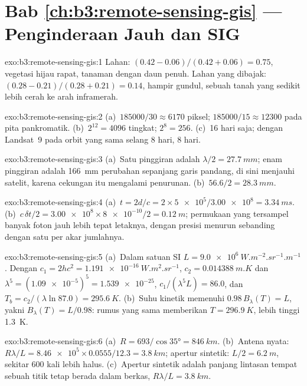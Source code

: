 \section*{Bab \ref{ch:b3:remote-sensing-gis} --- Penginderaan Jauh dan SIG}

\begin{solution}{exo:b3:remote-sensing-gis:1}
Lahan: $(0.42 - 0.06)/(0.42 + 0.06) = 0.75$, vegetasi hijau rapat, tanaman
dengan daun penuh. Lahan yang dibajak: $(0.28 - 0.21)/(0.28 + 0.21) = 0.14$, hampir
gundul, sebuah tanah yang sedikit lebih cerah ke arah inframerah.
\end{solution}

\begin{solution}{exo:b3:remote-sensing-gis:2}
(a)~$185000/30 \approx 6170$ piksel; $185000/15 \approx 12300$ pada
pita pankromatik. (b)~$2^{12} = 4096$ tingkat; $2^8 = 256$. (c)~16 hari
saja; dengan Landsat~9 pada orbit yang sama selang 8 hari, 8 hari.
\end{solution}

\begin{solution}{exo:b3:remote-sensing-gis:3}
(a)~Satu pinggiran adalah $\lambda/2 = \qty{27.7}{mm}$; enam pinggiran
adalah \qty{166}{mm} perubahan sepanjang garis pandang, di sini menjauhi satelit, karena
cekungan itu mengalami penurunan. (b)~$56.6/2 = \qty{28.3}{mm}$.
\end{solution}

\begin{solution}{exo:b3:remote-sensing-gis:4}
(a)~$t = 2d/c = 2\times\num{5e5}/\num{3.00e8} = \qty{3.34}{ms}$.
(b)~$c\,\delta t/2 = \num{3.00e8}\times\num{8e-10}/2 = \qty{0.12}{m}$; permukaan
yang tersampel banyak foton jauh lebih tepat letaknya, dengan presisi
menurun sebanding dengan satu per akar jumlahnya.
\end{solution}

\begin{solution}{exo:b3:remote-sensing-gis:5}
(a)~Dalam satuan SI $L = \qty{9.0e6}{W.m^{-2}.sr^{-1}.m^{-1}}$. Dengan $c_1 =
2hc^2 = \qty{1.191e-16}{W.m^2.sr^{-1}}$, $c_2 = \qty{0.014388}{m.K}$ dan
$\lambda^5 = (\num{1.09e-5})^5 = \num{1.539e-25}$, $c_1/(\lambda^5L) = 86.0$,
dan $T_b = c_2/(\lambda\ln 87.0) = \qty{295.6}{K}$. (b)~Suhu kinetik
memenuhi $0.98\,B_\lambda(T) = L$, yakni $B_\lambda(T) = L/0.98$: rumus
yang sama memberikan $T = \qty{296.9}{K}$, lebih tinggi \qty{1.3}{K}.
\end{solution}

\begin{solution}{exo:b3:remote-sensing-gis:6}
(a)~$R = 693/\cos\ang{35} = \qty{846}{km}$. (b)~Antena nyata: $R\lambda/L =
\num{8.46e5}\times0.0555/12.3 = \qty{3.8}{km}$; apertur sintetik: $L/2 =
\qty{6.2}{m}$, sekitar 600 kali lebih halus. (c)~Apertur sintetik adalah
panjang lintasan tempat sebuah titik tetap berada dalam berkas, $R\lambda/L =
\qty{3.8}{km}$.
\end{solution}


